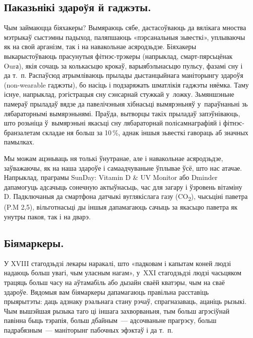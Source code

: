 \subsection*{Паказьнікі здароўя й гаджэты.}

Чым займаюцца біяхакеры? Вымяраюць сябе, дастасоўваюць да вялікага мноства мэтрыкаў сыстэмны падыход, паляпшаюць «пэрсанальныя зьвесткі», уплываючы як на свой арганізм, так і на навакольнае асяродзьдзе. Біяхакеры выкарыстоўваюць прасунутыя фітнэс-трэкеры (напрыклад, смарт-пярсьцёнак Ourа), якія сочаць за колькасьцю крокаў, варыябэльнасьцю пульсу, фазамі сну і да т.~п. Распаўсюд атрымліваюць прылады дыстанцыйнага маніторынгу здароўя (non-wearable гаджэты), бо насіць і подзаряжать шматлікія гаджэты няёмка. Таму існуе, напрыклад, рэгістрацыя сну сэнсарнай стужкай у~ложку. Зьмяншэньне памераў прыладаў вядзе да павелічэньня хібнасьці вымярэньняў у~параўнаньні зь лябараторнымі вымярэньнямі. Праўда, вытворцы такіх прыладаў запэўніваюць, што розьніца ў~вымярэньні якасьці сну лябараторнай полісамнаграфіяй і фітнэс-бранзалетам складае ня больш за 10\,\%, аднак іншыя зьвесткі гавораць аб значных памылках.


Мы можам ацэньваць ня толькі ўнутранае, але і навакольнае асяродзьдзе, заўважаючы, як на наша здароўе і самаадчуваньне ўплывае ўсё, што нас атачае. Напрыклад, праграмы SunDay: Vitamin D \& UV Monitor або Dminder дапамогуць адсачыць сонечную актыўнасьць, час для загару і ўзровень вітаміну D. Падключаныя да смартфона датчыкі вуглякіслага газу (CO\textsubscript{2}), чысьціні паветра (P.M 2,5), вільготнасьці ды іншыя дапамагаюць сачыць за якасьцю паветра як унутры пакоя, так і на дварэ.

\subsection*{Біямаркеры.}

У XVIII стагодзьдзі лекары наракалі, што «падковам і капытам коней людзі надаюць больш увагі, чым уласным нагам», у~XXI стагодзьдзі людзі часьцяком трацяць больш часу на аўтамабіль або дызайн сваёй кватэры, чым на сваё здароўе. Вядомыя вам біямаркеры дапамагаюць правільна расставіць прыярытэты: даць адзнаку рэальнага стану рэчаў, спрагназаваць, ацаніць рызыкі. Чым вышэйшая рызыка таго ці іншага захворваньня, тым больш агрэсіўнай павінна быць тэрапія, больш дбайным~--- адсочваньне прагрэсу, больш падрабязным~--- маніторынг пабочных эфэктаў і да т.~п.

